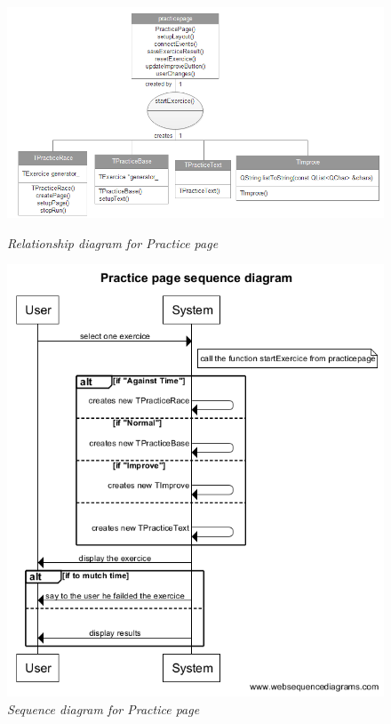 \begin{figure}[h]
\begin{center}
\begin{minipage}{0.2\linewidth}
      \centering \includegraphics[height=1\textwidth]{images/Rpracticepage.png}
      \caption{\it Relationship diagram for Practice page}   
\end{minipage}
\begin{minipage}{0.2\linewidth}
      \centering \includegraphics[height=1\textwidth]{images/Spracticepage.png}
      \caption{\it Sequence diagram for Practice page}
\end{minipage}
\end{center}
\end{figure}

